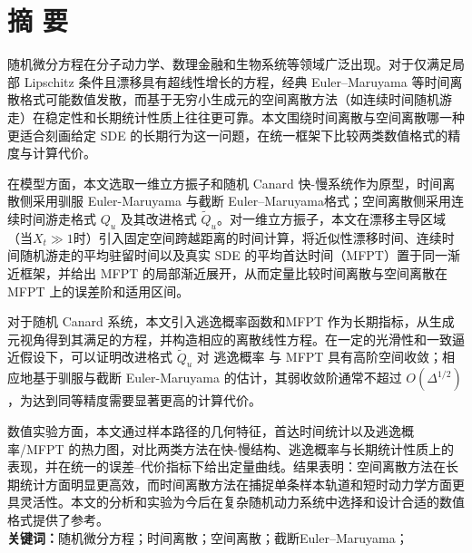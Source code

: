 \newpage
\pagestyle{plain}  %
\setcounter{page}{1}
\renewcommand{\thepage}{\Roman{page}}

	\section*{摘\hspace{2\ccwd} 要}
	\songti{} %
	
	随机微分方程在分子动力学、数理金融和生物系统等领域广泛出现。对于仅满足局部 Lipschitz 条件且漂移具有超线性增长的方程，经典 Euler–Maruyama 等时间离散格式可能数值发散，而基于无穷小生成元的空间离散方法（如连续时间随机游走）在稳定性和长期统计性质上往往更可靠。本文围绕时间离散与空间离散哪一种更适合刻画给定 SDE 的长期行为这一问题，在统一框架下比较两类数值格式的精度与计算代价。
	
	在模型方面，本文选取一维立方振子和随机 Canard 快-慢系统作为原型，时间离散侧采用驯服 Euler-Maruyama 与截断 Euler–Maruyama格式；空间离散侧采用连续时间游走格式 \(Q_u\) 及其改进格式 \(\widetilde Q_u\)。对一维立方振子，本文在漂移主导区域（当\(X_t \gg 1\)时）引入固定空间跨越距离的时间计算，将近似性漂移时间、连续时间随机游走的平均驻留时间以及真实 SDE 的平均首达时间（MFPT）置于同一渐近框架，并给出 MFPT 的局部渐近展开，从而定量比较时间离散与空间离散在 MFPT 上的误差阶和适用区间。
	
	对于随机 Canard 系统，本文引入逃逸概率函数和MFPT 作为长期指标，从生成元视角得到其满足的方程，并构造相应的离散线性方程。在一定的光滑性和一致逼近假设下，可以证明改进格式 \(\widetilde Q_u\) 对 逃逸概率 与 MFPT 具有高阶空间收敛；相应地基于驯服与截断 Euler-Maruyama 的估计，其弱收敛阶通常不超过 \(O(\Delta^{1/2})\)，为达到同等精度需要显著更高的计算代价。
	
	数值实验方面，本文通过样本路径的几何特征，首达时间统计以及逃逸概率/MFPT 的热力图，对比两类方法在快-慢结构、逃逸概率与长期统计性质上的表现，并在统一的误差–代价指标下给出定量曲线。结果表明：空间离散方法在长期统计方面明显更高效，而时间离散方法在捕捉单条样本轨道和短时动力学方面更具灵活性。本文的分析和实验为今后在复杂随机动力系统中选择和设计合适的数值格式提供了参考。
	\\   %
	
	{\songti\bf{}关键词：}随机微分方程；时间离散；空间离散；截断Euler–Maruyama；
	
